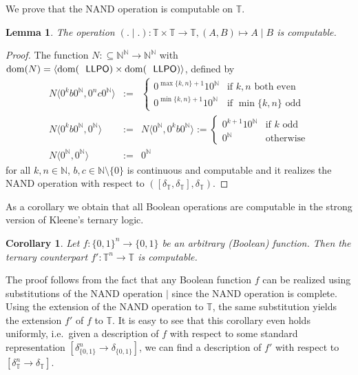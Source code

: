 \documentclass[jsl,10pt]{noasl}
\def\IN{{\mathbb{N}}}
\def\IT{{\mathbb{T}}}
\def\In{\subseteq}
\def\dom{{\rm dom}}
\def\LLPO{\text{\rm\sffamily LLPO}}
\def\LLPO{\text{\rm\sffamily LLPO}}
\newtheorem{lemma}[proposition]{Lemma}
\newtheorem{corollary}[proposition]{Corollary}
\begin{document}
We prove that the NAND operation is computable on $\IT$.

\begin{lemma}
\label{lem:NAND}
The operation $(.\mid.):\IT\times\IT\to\IT,(A,B)\mapsto A\mid B$
is computable.
\end{lemma}
\begin{proof}
The function $N:\In\IN^\IN\to\IN^\IN$ with 
$\dom(N)=\langle\dom(\LLPO)\times\dom(\LLPO)\rangle$, defined by
\begin{eqnarray*}
N\langle 0^kb0^\IN,0^nc0^\IN\rangle&:=&\left\{\begin{array}{ll}
                                 0^{\max\{k,n\}+1}10^\IN & \mbox{if $k,n$ both even}\\
                                 0^{\min\{k,n\}+1}10^\IN & \mbox{if $\min\{k,n\}$ odd}
                          \end{array}\right.\\
N\langle 0^kb0^\IN,0^\IN\rangle&:=&N\langle 0^\IN,0^kb0^\IN\rangle := \left\{\begin{array}{ll}
                                 0^{k+1}10^\IN & \mbox{if $k$ odd}\\
                                 0^\IN         & \mbox{otherwise}
                          \end{array}\right.\\
N\langle 0^\IN,0^\IN\rangle       &:=& 0^\IN
\end{eqnarray*}
for all $k,n\in\IN$, $b,c\in\IN\setminus\{0\}$
is continuous and computable and it realizes the NAND operation with respect to $([\delta_\IT,\delta_\IT],\delta_\IT)$.
\end{proof}

As a corollary we obtain that all Boolean operations are computable
in the strong version of Kleene's ternary logic.

\begin{corollary}
\label{cor:ternary}
Let $f:\{0,1\}^n\to\{0,1\}$ be an arbitrary (Boolean) function.
Then the ternary counterpart $f':\IT^n\to\IT$ is computable.
\end{corollary}

The proof follows from the fact that any Boolean function $f$ can be realized
using substitutions of the NAND operation $\mid$ since the NAND operation
is complete. Using the extension of the NAND operation to $\IT$, the same
substitution yields the extension $f'$ of $f$ to $\IT$.
It is easy to see that this corollary even holds uniformly,
i.e.\ given a description of $f$ with respect to some standard representation
$[\delta_{\{0,1\}}^n\to\delta_{\{0,1\}}]$, we can find a description of $f'$
with respect to $[\delta_\IT^n\to\delta_\IT]$.
\end{document}
